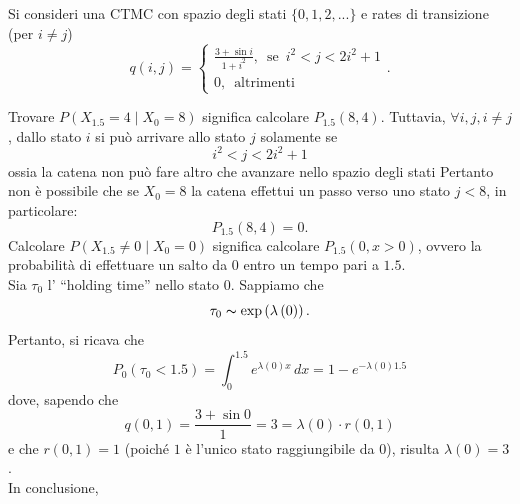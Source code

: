 \documentclass[11pt,largemargins]{homework}
\begin{document}
\section{}%
Si consideri una CTMC con spazio degli stati $\{0,1,2,...\}$ e rates di transizione (per $i\neq j$)
\begin{equation*}
q\left(i,j\right)=\begin{cases}\frac{3+\sin{i}}{1+i^{2}},\,\,\,\text{se}\,\,\,i^{2}<j<2i^{2}+1\\0, \,\,\,\text{altrimenti}\end{cases}.
\end{equation*}
\begin{alphaparts}
\questionpart
Trovare $P\left(X_{1.5}=4 \mid X_{0}=8\right)$ significa calcolare $P_{1.5}\left(8,4\right)$. Tuttavia, $\forall i,j, i\neq j$, dallo stato $i$ si può arrivare allo stato $j$ solamente se 
\begin{equation*}
i^2<j<2i^{2}+1
\end{equation*}
ossia la catena non può fare altro che avanzare nello spazio degli stati Pertanto non è possibile che se \(X_0 = 8\) la catena effettui un passo verso uno stato \(j<8\), in particolare:
\begin{equation*}
P_{1.5}\left(8,4\right)=0.
\end{equation*}
\questionpart
Calcolare $P\left(X_{1.5}\neq 0 \mid X_{0}=0\right)$ significa calcolare $P_{1.5}\left(0,x>0\right)$, ovvero la probabilità di effettuare un salto da $0$ entro un tempo pari a $1.5$.\\
Sia $\tau_{0}$ l' ``holding time'' nello stato $0$. Sappiamo che
\begin{equation*}
\tau_{0}\thicksim \text{exp}\left(\lambda\left(0\right)\right).
\end{equation*}
Pertanto, si ricava che
\begin{equation*}
P_{0}\left(\tau_{0}<1.5\right)=\int_{0}^{1.5} e^{\lambda\left(0\right)x} \,dx= 1 - e^{-\lambda\left(0\right)1.5}
\end{equation*}
dove, sapendo che
\begin{equation*}
q\left(0,1\right)=\frac{3+\sin{0}}{1}=3=\lambda\left(0\right)\cdot r\left(0,1\right)
\end{equation*}
e che $r\left(0,1\right)=1$ (poiché $1$ è l'unico stato raggiungibile da $0$), risulta $\lambda\left(0\right)=3$.\\
In conclusione,
\begin{equation*}

\end{equation*}
\end{alphaparts}
\end{document}
